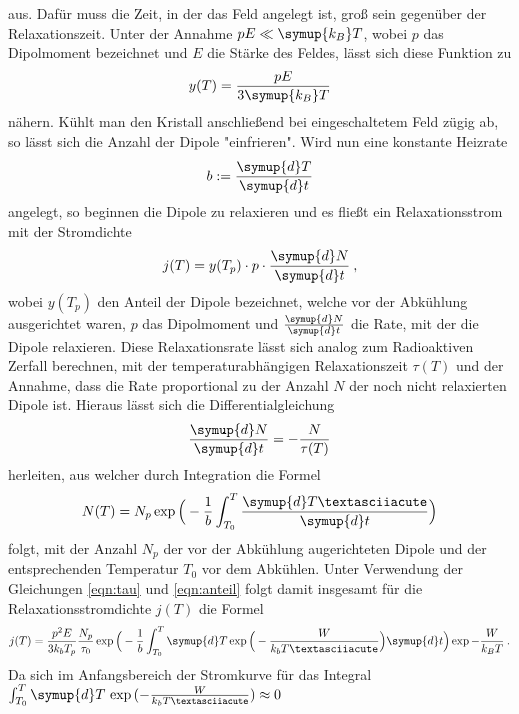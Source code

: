 aus. Dafür muss die Zeit, in der das Feld angelegt ist, groß sein gegenüber
der Relaxationszeit.
Unter der Annahme $pE\ll\symup{k_B}T$, wobei $p$ das Dipolmoment bezeichnet und $E$ die
Stärke des Feldes, lässt sich diese Funktion zu
\begin{equation}
  y(T)=\frac{pE}{3\symup{k_B}T}
  \label{eqn:anteil}
\end{equation}
nähern. Kühlt man den Kristall anschließend bei eingeschaltetem Feld zügig ab, so lässt sich
die Anzahl der Dipole "einfrieren". Wird nun eine konstante Heizrate
\begin{equation}
  b:=\frac{\symup{d}T}{\symup{d}t}
  \label{eqn:hrate}
\end{equation}
angelegt, so beginnen die Dipole zu relaxieren und es fließt ein Relaxationsstrom mit der Stromdichte
\begin{equation}
  j(T)=y(T_p)\cdot p \cdot \frac{\symup{d}N}{\symup{d}t} \:,
\end{equation}
wobei $y(T_p)$ den Anteil der Dipole bezeichnet, welche vor der Abkühlung ausgerichtet waren,
$p$ das Dipolmoment und $\frac{\symup{d}N}{\symup{d}t}$ die Rate, mit der die Dipole relaxieren.
Diese Relaxationsrate lässt sich analog zum Radioaktiven Zerfall berechnen, mit der temperaturabhängigen
Relaxationszeit $\tau(T)$ und der Annahme, dass die Rate proportional zu der Anzahl $N$ der noch nicht relaxierten
Dipole ist. Hieraus lässt sich die Differentialgleichung
\begin{equation}
  \frac{\symup{d}N}{\symup{d}t}=-\frac{N}{\tau(T)}
  \label{eqn:DGL}
\end{equation}
herleiten, aus welcher durch Integration die Formel
\begin{equation}
  N(T)=N_p \exp{\Big(-\frac{1}{b}\int_{T_0}^{T} \frac{\symup{d}T´}{\symup{d}t}\Big)}
\end{equation}
folgt, mit der Anzahl $N_p$ der vor der Abkühlung augerichteten Dipole
und der entsprechenden Temperatur $T_0$ vor dem Abkühlen. Unter Verwendung
der Gleichungen \eqref{eqn:tau} und \eqref{eqn:anteil} folgt damit insgesamt für die
Relaxationsstromdichte $j(T)$ die Formel
\begin{equation}
  j(T)=\frac{p^2E}{3k_bT_p}\frac{N_p}{\tau_0}  \exp{\Big(-\frac{1}{b}\int_{T_0}^{T}
  \symup{d}T\exp{\Big(-\frac{W}{k_bT´}\Big)}{\symup{d}t}\Big)}
  \exp{-\frac{W}{k_BT}} \:.
  \label{eqn:stromd}
\end{equation}
Da sich im Anfangsbereich der Stromkurve für das Integral $\int_{T_0}^{T} \symup{d}T\,\exp{(-\frac{W}{k_bT´})} \approx 0$
